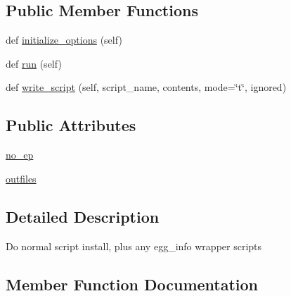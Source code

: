 \subsection*{Public Member Functions}
\begin{DoxyCompactItemize}
\item 
def \hyperlink{classsetuptools_1_1command_1_1install__scripts_1_1install__scripts_aa30384b8a35469d73e4da8b343f338a5}{initialize\+\_\+options} (self)
\item 
def \hyperlink{classsetuptools_1_1command_1_1install__scripts_1_1install__scripts_a7be3bccb3d044a874127101f8ffd8dc8}{run} (self)
\item 
def \hyperlink{classsetuptools_1_1command_1_1install__scripts_1_1install__scripts_a6adf5034843d12224638090ba6720aac}{write\+\_\+script} (self, script\+\_\+name, contents, mode=\char`\"{}t\char`\"{}, ignored)
\end{DoxyCompactItemize}
\subsection*{Public Attributes}
\begin{DoxyCompactItemize}
\item 
\hyperlink{classsetuptools_1_1command_1_1install__scripts_1_1install__scripts_ab3f8cf531a8e925503b2b9d598c48744}{no\+\_\+ep}
\item 
\hyperlink{classsetuptools_1_1command_1_1install__scripts_1_1install__scripts_a1405b8119b7dce643aeb6f477bd7947f}{outfiles}
\end{DoxyCompactItemize}


\subsection{Detailed Description}
\begin{DoxyVerb}Do normal script install, plus any egg_info wrapper scripts\end{DoxyVerb}
 

\subsection{Member Function Documentation}
\mbox{\label{classsetuptools_1_1command_1_1install__scripts_1_1install__scripts_aa30384b8a35469d73e4da8b343f338a5}} 
